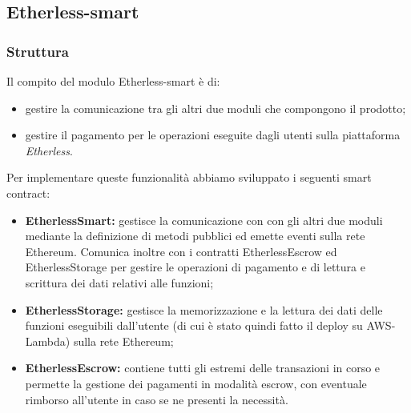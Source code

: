 \subsection{Etherless-smart}

\subsubsection{Struttura}
  Il compito del modulo Etherless-smart è di:
  \begin{itemize}
    \item gestire la comunicazione tra gli altri due moduli che compongono il prodotto;
    \item gestire il pagamento per le operazioni eseguite dagli utenti sulla piattaforma \textit{Etherless}.
  \end{itemize}
  Per implementare queste funzionalità abbiamo sviluppato i seguenti smart contract:
  \begin{itemize}
    \item \textbf{EtherlessSmart:} gestisce la comunicazione con con gli altri due moduli mediante la definizione di metodi pubblici ed emette eventi sulla rete Ethereum. Comunica inoltre con i contratti EtherlessEscrow ed EtherlessStorage per gestire le operazioni di pagamento e di lettura e scrittura dei dati relativi alle funzioni;
    \item \textbf{EtherlessStorage:} gestisce la memorizzazione e la lettura dei dati delle funzioni eseguibili dall'utente (di cui è stato quindi fatto il deploy su AWS-Lambda) sulla rete Ethereum;
    \item \textbf{EtherlessEscrow:} contiene tutti gli estremi delle transazioni in corso e permette la gestione dei pagamenti in modalità escrow, con eventuale rimborso all'utente in caso se ne presenti la necessità.
  \end{itemize}

